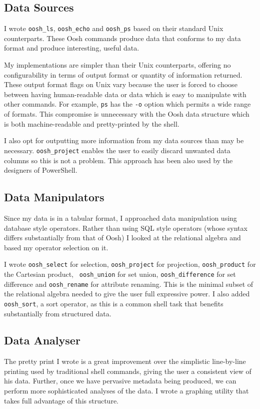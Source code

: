 \documentclass[12pt,twoside,notitlepage]{report}
\begin{document}
\subsection{Data Sources}
I wrote {\tt oosh\_ls}, {\tt oosh\_echo} and {\tt oosh\_ps} based on
their standard Unix counterparts. These Oosh commands produce data
that conforms to my data format and produce interesting, useful data.

My implementations are simpler than their Unix counterparts, offering
no configurability in terms of output format or quantity of
information returned. These output format flags on Unix vary because
the user is forced to choose between having human-readable data or
data which is easy to manipulate with other commands. For example,
{\tt ps} has the {\tt -o} option which permits a wide range of
formats. This compromise is unnecessary with the Oosh data structure
which is both machine-readable and pretty-printed by the shell.

I also opt for outputting more information from my data sources than
may be necessary. {\tt oosh\_project} enables the user to easily
discard unwanted data columns so this is not a problem. This approach
has been also used by the designers of PowerShell.

\subsection{Data Manipulators}
Since my data is in a tabular format, I approached data manipulation
using database style operators. Rather than using SQL style operators
(whose syntax differs substantially from that of Oosh) I looked at the
relational algebra and based my operator selection on it.

I wrote {\tt oosh\_select} for selection, {\tt oosh\_project} for
projection, {\tt oosh\_product} for the Cartesian product, {\tt
  oosh\_union} for set union, {\tt oosh\_difference} for set
difference and {\tt oosh\_rename} for attribute renaming. This is the
minimal subset of the relational algebra needed to give the user full
expressive power. I also added {\tt oosh\_sort}, a sort operator, as
this is a common shell task that benefits substantially from
structured data.

\subsection{Data Analyser}
The pretty print I wrote is a great improvement over the simplistic
line-by-line printing used by traditional shell commands, giving the
user a consistent view of his data. Further, once we have pervasive
metadata being produced, we can perform more sophisticated analyses of
the data. I wrote a graphing utility that takes full advantage of this
structure.
\end{document}
